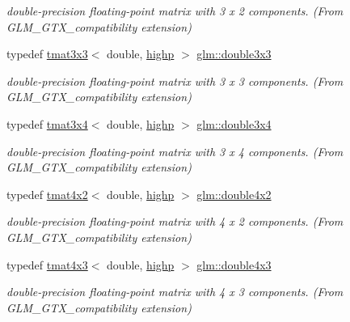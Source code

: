 \begin{DoxyCompactItemize}
\begin{DoxyCompactList}\small\item\em double-\/precision floating-\/point matrix with 3 x 2 components. (From G\+L\+M\+\_\+\+G\+T\+X\+\_\+compatibility extension) \end{DoxyCompactList}\item 
typedef \mbox{\hyperlink{structglm_1_1tmat3x3}{tmat3x3}}$<$ double, \mbox{\hyperlink{namespaceglm_a0f04f086094c747d227af4425893f545ac6f7eab42eacbb10d59a58e95e362074}{highp}} $>$ \mbox{\hyperlink{group__gtx__compatibility_ga3bcec888e1dca957b39c2213b740ff21}{glm\+::double3x3}}
\begin{DoxyCompactList}\small\item\em double-\/precision floating-\/point matrix with 3 x 3 components. (From G\+L\+M\+\_\+\+G\+T\+X\+\_\+compatibility extension) \end{DoxyCompactList}\item 
typedef \mbox{\hyperlink{structglm_1_1tmat3x4}{tmat3x4}}$<$ double, \mbox{\hyperlink{namespaceglm_a0f04f086094c747d227af4425893f545ac6f7eab42eacbb10d59a58e95e362074}{highp}} $>$ \mbox{\hyperlink{group__gtx__compatibility_gaa30d4862bab3c5aa40225105a06b62cc}{glm\+::double3x4}}
\begin{DoxyCompactList}\small\item\em double-\/precision floating-\/point matrix with 3 x 4 components. (From G\+L\+M\+\_\+\+G\+T\+X\+\_\+compatibility extension) \end{DoxyCompactList}\item 
typedef \mbox{\hyperlink{structglm_1_1tmat4x2}{tmat4x2}}$<$ double, \mbox{\hyperlink{namespaceglm_a0f04f086094c747d227af4425893f545ac6f7eab42eacbb10d59a58e95e362074}{highp}} $>$ \mbox{\hyperlink{group__gtx__compatibility_ga66ee22fb774d38f1484670c1afa230da}{glm\+::double4x2}}
\begin{DoxyCompactList}\small\item\em double-\/precision floating-\/point matrix with 4 x 2 components. (From G\+L\+M\+\_\+\+G\+T\+X\+\_\+compatibility extension) \end{DoxyCompactList}\item 
typedef \mbox{\hyperlink{structglm_1_1tmat4x3}{tmat4x3}}$<$ double, \mbox{\hyperlink{namespaceglm_a0f04f086094c747d227af4425893f545ac6f7eab42eacbb10d59a58e95e362074}{highp}} $>$ \mbox{\hyperlink{group__gtx__compatibility_gadad0d5da7181385a05567469d4a5dd9a}{glm\+::double4x3}}
\begin{DoxyCompactList}\small\item\em double-\/precision floating-\/point matrix with 4 x 3 components. (From G\+L\+M\+\_\+\+G\+T\+X\+\_\+compatibility extension) \end{DoxyCompactList}\item 

\end{DoxyCompactItemize}
